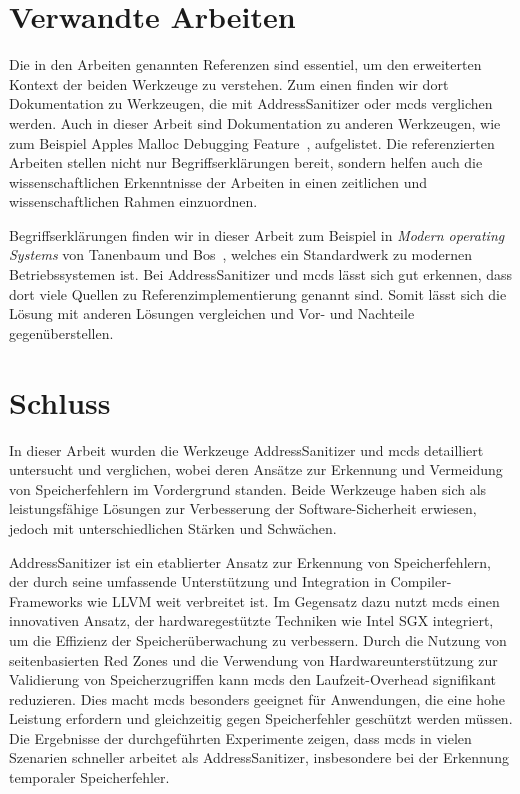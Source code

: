 \documentclass[acmtog,nonacm]{acmart}
\begin{document}
\section{Verwandte Arbeiten}

Die in den Arbeiten genannten Referenzen sind essentiel, um den erweiterten
Kontext der beiden Werkzeuge zu verstehen. Zum einen finden wir dort
Dokumentation zu Werkzeugen, die mit AddressSanitizer oder mcds verglichen
werden. Auch in dieser Arbeit sind Dokumentation zu anderen Werkzeugen, wie zum
Beispiel Apples Malloc Debugging Feature~\cite{guard-malloc_2024}, aufgelistet.
Die referenzierten Arbeiten stellen nicht nur Begriffserklärungen bereit,
sondern helfen auch die wissenschaftlichen Erkenntnisse der Arbeiten in einen
zeitlichen und wissenschaftlichen Rahmen einzuordnen.

Begriffserklärungen finden wir in dieser Arbeit zum Beispiel in \textit{Modern operating Systems} von Tanenbaum und Bos~\cite{tanenbaum-modern_2015}, welches ein Standardwerk zu modernen
Betriebssystemen ist. Bei AddressSanitizer und mcds lässt sich gut erkennen,
dass dort viele Quellen zu Referenzimplementierung genannt sind. Somit lässt
sich die Lösung mit anderen Lösungen vergleichen und Vor- und Nachteile
gegenüberstellen.

\section{Schluss}

In dieser Arbeit wurden die Werkzeuge AddressSanitizer und mcds
detailliert untersucht und verglichen, wobei deren Ansätze zur Erkennung und
Vermeidung von Speicherfehlern im Vordergrund standen. Beide Werkzeuge haben
sich als leistungsfähige Lösungen zur Verbesserung der Software-Sicherheit
erwiesen, jedoch mit unterschiedlichen Stärken und Schwächen.

AddressSanitizer ist ein etablierter Ansatz zur Erkennung von Speicherfehlern,
der durch seine umfassende Unterstützung und Integration in Compiler-Frameworks
wie LLVM weit verbreitet ist. Im Gegensatz dazu nutzt mcds einen innovativen
Ansatz, der hardwaregestützte Techniken wie Intel SGX integriert, um die
Effizienz der Speicherüberwachung zu verbessern. Durch die Nutzung von
seitenbasierten Red Zones und die Verwendung von Hardwareunterstützung zur
Validierung von Speicherzugriffen kann mcds den Laufzeit-Overhead signifikant
reduzieren. Dies macht mcds besonders geeignet für Anwendungen, die eine hohe
Leistung erfordern und gleichzeitig gegen Speicherfehler geschützt werden
müssen. Die Ergebnisse der durchgeführten Experimente zeigen, dass mcds in
vielen Szenarien schneller arbeitet als AddressSanitizer, insbesondere bei der Erkennung
temporaler Speicherfehler.
\end{document}
